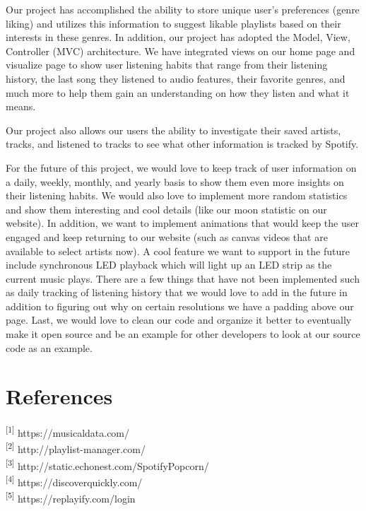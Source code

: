 \documentclass[letter, 11pt]{article}
\begin{document}
Our project has accomplished the ability to store unique user’s preferences (genre liking) and utilizes this information to suggest likable playlists based on their interests in these genres. In addition, our project has adopted the Model, View, Controller (MVC) architecture. We have integrated views on our home page and visualize page to show user listening habits that range from their listening history, the last song they listened to audio features, their favorite genres, and much more to help them gain an understanding on how they listen and what it means.

Our project also allows our users the ability to investigate their saved artists, tracks, and listened to tracks to see what other information is tracked by Spotify.

For the future of this project, we would love to keep track of user information on a daily, weekly, monthly, and yearly basis to show them even more insights on their listening habits. We would also love to implement more random statistics and show them interesting and cool details (like our moon statistic on our website). In addition, we want to implement animations that would keep the user engaged and keep returning to our website (such as canvas videos that are available to select artists now). A cool feature we want to support in the future include synchronous LED playback which will light up an LED strip as the current music plays.  There are a few things that have not been implemented such as daily tracking of listening history that we would love to add in the future in addition to figuring out why on certain resolutions we have a padding above our page. Last, we would love to clean our code and organize it better to eventually make it open source and be an example for other developers to look at our source code as an example.



\section*{References}

\noindent
{\textsuperscript{[1]} https://musicaldata.com/} \\
{\textsuperscript{[2]} http://playlist-manager.com/} \\
{\textsuperscript{[3]} http://static.echonest.com/SpotifyPopcorn/}\\
{\textsuperscript{[4]} https://discoverquickly.com/}\\
{\textsuperscript{[5]} https://replayify.com/login}
\end{document}
